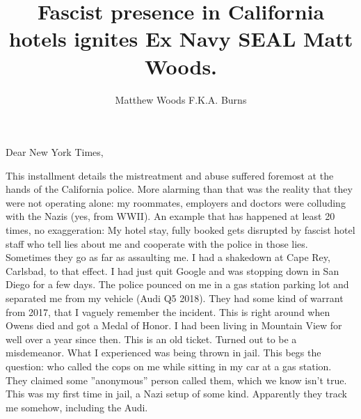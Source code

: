 \documentclass[a4paper]{arthur-letter}
\title{Fascist presence in California hotels ignites Ex Navy SEAL Matt Woods.}
\author{Matthew Woods F.K.A. Burns}
\begin{document}
    \makeprofile %
    
    \address{Matthew Woods,\\PO Box 376\\Mountain View, CA, 94042}

    \begin{letter}

    \subject{TLDR: I'm a former Navy SEAL, smeared by Dianna Cowern (AKA Physics Girl) via Alphabet Inc. while working as a Google employee. From 2015-2020, I have experienced severe police misconduct first hand. This is across five counties: San Diego, Orange, Santa Clara, Oahu and Hawaii. I think they may have ties to THE Nazis, since my entire immediate family (Donald Burns, Anne Burns and Susan Burns) are Nazis... the type that agree with Adolf Hitler and Eichmann of WWII. They lied to me about this since I was born. Target Corporation, local strip malls and police succumb to fascism and try to suppress me in all ways. on top of that, Citigroup Inc. and Wells Fargo launch denial of service attacks to me and XignalX Inc: a struggling startup owned by disabled former US Navy SEALs in Hawaii. Nation state level hacking is apparent. Police, employers, hotel conglomerates and former Navy team mates cooperate to rob, assault and lie to me in concert.
}
            
    \opening{Dear New York Times,}
    
    This installment details the mistreatment and abuse suffered foremost at the hands of the California police. More alarming than that was the reality that they were not operating alone: my roommates, employers and doctors were colluding with the Nazis (yes, from WWII). An example that has happened at least 20 times, no exaggeration: My hotel stay, fully booked gets disrupted by fascist hotel staff who tell lies about me and cooperate with the police in those lies. Sometimes they go as far as assaulting me. I had a shakedown at Cape Rey, Carlsbad, to that effect. I had just quit Google and was stopping down in San Diego for a few days. The police pounced on me in a gas station parking lot and separated me from my vehicle (Audi Q5 2018). They had some kind of warrant from 2017, that I vaguely remember the incident. This is right around when Owens died and got a Medal of Honor. I had been living in Mountain View for well over a year since then. This is an old ticket. Turned out to be a misdemeanor. What I experienced was being thrown in jail. This begs the question: who called the cops on me while sitting in my car at a gas station. They claimed some ''anonymous'' person called them, which we know isn't true. This was my first time in jail, a Nazi setup of some kind. Apparently they track me somehow, including the Audi. 
    

\end{letter}
\end{document}
